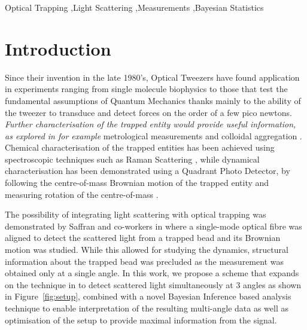 \documentclass[final,  3p]{elsarticle}
\begin{document}
\begin{frontmatter}
\begin{keyword}
	Optical Trapping \sep Light Scattering \sep Measurements \sep Bayesian Statistics 
\end{keyword}

\end{frontmatter}

\section{Introduction}
\label{sec:Intro}

Since their invention in the late 1980's, Optical Tweezers have found application in experiments ranging from single molecule biophysics \cite{Bustamante2021Biophysics} to those that test the fundamental assumptions of Quantum Mechanics  \cite{yin2013large} thanks mainly to the ability of the tweezer to transduce and detect forces on the order of a few pico newtons. \textit{Further characterisation of the trapped entity would provide useful information, as explored in for example} metrological measurements \cite{arita2020coherent} and colloidal aggregation \cite{burns1990optical}. Chemical characterisation of the trapped entities has been achieved using spectroscopic techniques such as Raman Scattering \cite{gupta2014raman}, while dynamical characterisation has been demonstrated using a Quadrant Photo Detector,  by following the centre-of-mass Brownian motion of the trapped entity  \cite{friedrich2012tuning} and measuring rotation  of the centre-of-mass \cite{yifat2021facile}. 

The possibility of integrating light scattering with optical trapping was demonstrated by Saffran and co-workers in \cite{Bar-Ziv_1998} where a single-mode optical fibre was aligned to detect the scattered
light from a trapped bead and its Brownian motion was studied.  While this allowed for studying the dynamics, structural information about the trapped bead was precluded as the measurement was obtained only at a single angle.  In this work, we propose a scheme that expands on the technique in \cite{Bar-Ziv_1998} to detect scattered light simultaneously at 3 angles as shown in Figure~\ref{fig:setup}, combined with a novel Bayesian Inference based analysis technique to enable interpretation of the resulting multi-angle data as well as optimisation of the setup to provide maximal information from the signal.
\end{document}
